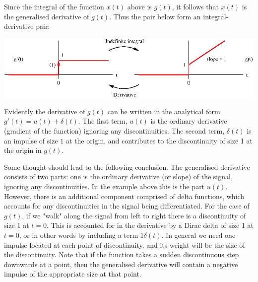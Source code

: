 \documentclass[10pt]{beamer}
\begin{document}
Since the integral of the function $x(t)$ above is $g(t)$, it follows that $x(t)$ is the generalised derivative of $g(t)$.  Thus the pair below form an integral-derivative pair:
\begin{center}
  \includegraphics{genderivex3}
\end{center}
Evidently the derivative of $g(t)$ can be written in the analytical form $g'(t) = u(t) + \delta(t)$.  The first term, $u(t)$ is the ordinary derivative (gradient of the function) ignoring any discontinuities.  The second term, $\delta(t)$ is an impulse of size $1$ at the origin, and contributes to the discontinuity of size 1 at the origin in $g(t)$.

Some thought should lead to the following conclusion.  The generalised derivative consists of two parts:  one is the ordinary derivative (or slope) of the signal, ignoring any discontinuities.  In the example above this is the part $u(t)$.  However, there is an additional component comprised of delta functions, which accounts for any discontinuities in the signal being differentiated.  For the case of $g(t)$, if we "walk" along the signal from left to right there is a discontinuity of size 1 at $t=0$.  This is accounted for in the derivative by a Dirac delta of size 1 at $t=0$, or in other words by including a term $1 \delta(t)$.  In general we need one impulse located at each point of discontinuity, and its weight will be the size of the discontinuity.  Note that if the function takes a sudden discontinuous step downwards at a point, then the generalised derivative will contain a negative impulse of the appropriate size at that point.
\end{document}
